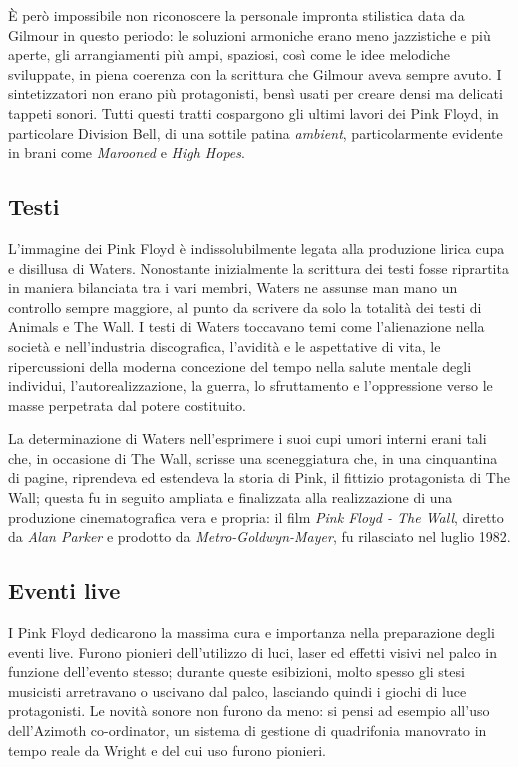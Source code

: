 \documentclass[class=book, crop=false, oneside, 12pt]{standalone}
\begin{document}
    È però impossibile non riconoscere la personale impronta stilistica data da Gilmour in questo periodo: le soluzioni armoniche erano meno jazzistiche e più aperte, gli arrangiamenti più ampi, spaziosi, così come le idee melodiche sviluppate, in piena coerenza con la scrittura che Gilmour aveva sempre avuto. I sintetizzatori non erano più protagonisti, bensì usati per creare densi ma delicati tappeti sonori. Tutti questi tratti cospargono gli ultimi lavori dei Pink Floyd, in particolare Division Bell, di una sottile patina \emph{ambient}, particolarmente evidente in brani come \emph{Marooned} e \emph{High Hopes}.

    \subsection{Testi}
    L'immagine dei Pink Floyd è indissolubilmente legata alla produzione lirica cupa e disillusa di Waters. Nonostante inizialmente la scrittura dei testi fosse riprartita in maniera bilanciata tra i vari membri, Waters ne assunse man mano un controllo sempre maggiore, al punto da scrivere da solo la totalità dei testi  di Animals e The Wall. I testi di Waters toccavano temi come l'alienazione nella società e nell'industria discografica, l'avidità e le aspettative di vita, le ripercussioni della moderna concezione del tempo nella salute mentale degli individui, l'autorealizzazione, la guerra, lo sfruttamento e l'oppressione verso le masse perpetrata dal potere costituito. 

    La determinazione di Waters nell'esprimere i suoi cupi umori interni erani tali che, in occasione di The Wall, scrisse una sceneggiatura che, in una cinquantina di pagine, riprendeva ed estendeva la storia di Pink, il fittizio protagonista di The Wall; questa fu in seguito ampliata e finalizzata alla realizzazione di una produzione cinematografica vera e propria: il film \emph{Pink Floyd - The Wall}, diretto da \emph{Alan Parker} e prodotto da \emph{Metro-Goldwyn-Mayer}, fu rilasciato nel luglio 1982.

    \subsection{Eventi live}
    I Pink Floyd dedicarono la massima cura e importanza nella preparazione degli eventi live. Furono pionieri dell'utilizzo di luci, laser ed effetti visivi nel palco in funzione dell'evento stesso; durante queste esibizioni, molto spesso gli stesi musicisti arretravano o uscivano dal palco, lasciando quindi i giochi di luce protagonisti. Le novità sonore non furono da meno: si pensi ad esempio all'uso dell'Azimoth co-ordinator, un sistema di gestione di quadrifonia manovrato in tempo reale da Wright e del cui uso furono pionieri.
\end{document}
